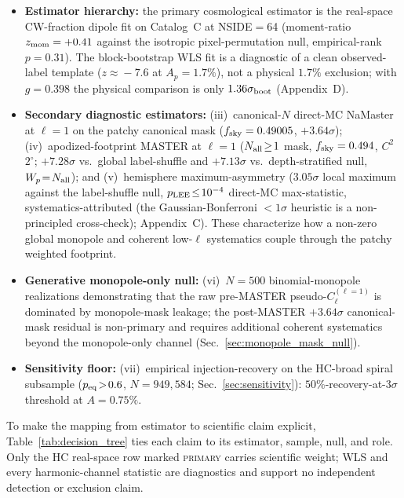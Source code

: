 \documentclass[aps,prd,twocolumn,superscriptaddress,preprintnumbers,nofootinbib,longbibliography,floatfix]{revtex4-2}
\newcommand{\sigmaunit}{\sigma}
\begin{document}
\begin{itemize}\setlength{\itemsep}{0pt}
\item \textbf{Estimator hierarchy:} the primary cosmological estimator is the real-space CW-fraction dipole fit on Catalog~C at NSIDE$=$64 (moment-ratio $z_{\rm mom}=+0.41$ against the isotropic pixel-permutation null, empirical-rank $p=0.31$). The block-bootstrap WLS fit is a diagnostic of a clean observed-label template ($z\!\approx\!-7.6$ at $A_p=1.7\%$), not a physical $1.7\%$ exclusion; with $g=0.398$ the physical comparison is only $1.36\sigma_{\rm boot}$ (Appendix~D).
\item \textbf{Secondary diagnostic estimators:} (iii)~canonical-$N$ direct-MC NaMaster at $\ell=1$ on the patchy canonical mask ($f_{\rm sky}=0.49005$, $+3.64\sigmaunit$); (iv)~apodized-footprint MASTER at $\ell=1$ ($N_{\rm all}\!\geq\!1$ mask, $f_{\rm sky}=0.494$, $C^2$ $2^\circ$; $+7.28\sigmaunit$ vs.\ global label-shuffle and $+7.13\sigmaunit$ vs.\ depth-stratified null, $W_p\!=\!N_{\rm all}$); and (v)~hemisphere maximum-asymmetry ($3.05\sigmaunit$ local maximum against the label-shuffle null, $p_{\rm LEE}\!\le\!10^{-4}$ direct-MC max-statistic, systematics-attributed (the Gaussian-Bonferroni $<\!1\sigmaunit$ heuristic is a non-principled cross-check); Appendix~C). These characterize how a non-zero global monopole and coherent low-$\ell$ systematics couple through the patchy weighted footprint.
\item \textbf{Generative monopole-only null:} (vi)~$N=500$ binomial-monopole realizations demonstrating that the raw pre-MASTER pseudo-$C_\ell^{(\ell=1)}$ is dominated by monopole-mask leakage; the post-MASTER $+3.64\sigmaunit$ canonical-mask residual is non-primary and requires additional coherent systematics beyond the monopole-only channel (Sec.~\ref{sec:monopole_mask_null}).
\item \textbf{Sensitivity floor:} (vii)~empirical injection-recovery on the HC-broad spiral subsample ($p_{\rm eq}\!>\!0.6$, $N\!=\!949{,}584$; Sec.~\ref{sec:sensitivity}): $50\%$-recovery-at-$3\sigma$ threshold at $A\!=\!0.75\%$.
\end{itemize}

To make the mapping from estimator to scientific claim explicit, Table~\ref{tab:decision_tree} ties each claim to its estimator, sample, null, and role. Only the HC real-space row marked \textsc{primary} carries scientific weight; WLS and every harmonic-channel statistic are diagnostics and support no independent detection or exclusion claim.
\end{document}
